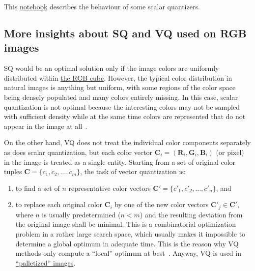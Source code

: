 This \href{https://github.com/vicente-gonzalez-ruiz/quantization/blob/master/digital_quantization.ipynb}{notebook} describes the behaviour of some scalar quantizers.

\subsection{More insights about SQ and VQ used on RGB images}
SQ would be an optimal solution only if the image colors are uniformly
distributed within
\href{https://en.wikipedia.org/wiki/RGB_color_model}{the RGB
  cube}. However, the typical color distribution in natural images is
anything but uniform, with some regions of the color space being
densely populated and many colors entirely missing. In this case,
scalar quantization is not optimal because the interesting colors may
not be sampled with suﬃcient density while at the same time colors are
represented that do not appear in the image at
all~\cite{burger2016digital}.

On the other hand, VQ does not treat the individual color components
separately as does scalar quantization, but each color vector
${\mathbf C}_i = ({\mathbf R}_i, {\mathbf G}_i, {\mathbf B}_i )$ (or
pixel) in the image is treated as a single entity. Starting from a set
of original color tuples ${\mathbf C} = \{c_1, c_2, \ldots ,c_m\}$,
the task of vector quantization is:
\begin{enumerate}
\item to ﬁnd a set of $n$ representative color vectors
  ${\mathbf C}' = \{c'_1, c'_2 ,\ldots , c'_n \}$, and
\item to replace each original color ${\mathbf C}_i$ by one of the new
  color vectors ${\mathbf C}'_j\in {\mathbf C}'$, where $n$ is usually
  predetermined ($n < m$) and the resulting deviation from the
  original image shall be minimal. This is a combinatorial
  optimization problem in a rather large search space, which usually
  makes it impossible to determine a global optimum in adequate
  time. This is the reason why VQ methods only compute a ``local''
  optimum at best~\cite{burger2016digital}. Anyway, VQ is used in
  \href{https://en.wikipedia.org/wiki/Palette_(computing)}{``palletized''
    images}.
\end{enumerate}

